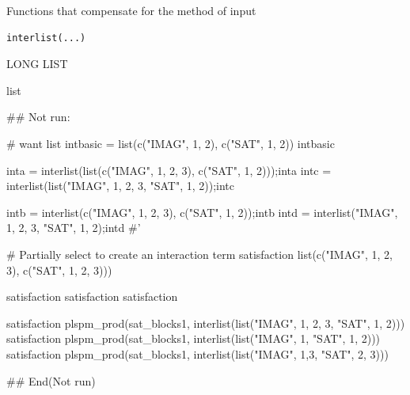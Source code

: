 \documentclass[a4paper]{book}
\begin{document}
%
\begin{Description}
Functions that compensate for the method of input
\end{Description}
%
\begin{Usage}
\begin{verbatim}
interlist(...)
\end{verbatim}
\end{Usage}
%
\begin{Arguments}
\begin{ldescription}
\item[\code{...}] LONG LIST
\end{ldescription}
\end{Arguments}
%
\begin{Value}
list
\end{Value}
%
\begin{Examples}
\begin{ExampleCode}

## Not run: 


# want list
intbasic = list(c("IMAG", 1, 2), c("SAT", 1, 2))
intbasic

inta = interlist(list(c("IMAG", 1, 2, 3), c("SAT", 1, 2)));inta
intc = interlist(list("IMAG", 1, 2, 3, "SAT", 1, 2));intc

intb = interlist(c("IMAG", 1, 2, 3), c("SAT", 1, 2));intb
intd = interlist("IMAG", 1, 2, 3, "SAT", 1, 2);intd
#'

# Partially select to create an interaction term
satisfaction%
                           list(c("IMAG", 1, 2, 3), c("SAT", 1, 2, 3))) %

satisfaction%
satisfaction%
satisfaction%



satisfaction%
plspm_prod(sat_blocks1, interlist(list("IMAG", 1, 2, 3, "SAT", 1, 2))) %
satisfaction%
plspm_prod(sat_blocks1, interlist(list("IMAG", 1, "SAT", 1, 2))) %
satisfaction%
plspm_prod(sat_blocks1, interlist(list("IMAG", 1,3,  "SAT", 2, 3))) %





## End(Not run)



\end{ExampleCode}
\end{Examples}
\end{document}
